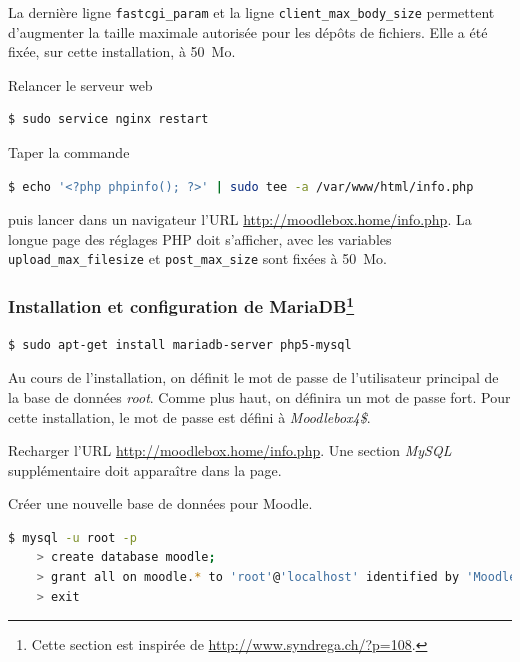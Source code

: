 \documentclass[11pt]{article}
\begin{document}


La dernière ligne \lstinline{fastcgi_param} et la ligne \lstinline{client_max_body_size} permettent d'augmenter la taille maximale autorisée pour les dépôts de fichiers. Elle a été fixée, sur cette installation, à 50~Mo.

Relancer le serveur web
\begin{lstlisting}[language=bash]
$ sudo service nginx restart
\end{lstlisting}

\begin{verification}
Taper la commande
\begin{lstlisting}[language=bash]
$ echo '<?php phpinfo(); ?>' | sudo tee -a /var/www/html/info.php
\end{lstlisting}
puis lancer dans un navigateur l'URL \url{http://moodlebox.home/info.php}. La longue page des réglages PHP doit s'afficher, avec les variables \lstinline{upload_max_filesize} et \lstinline{post_max_size} sont fixées à 50~Mo.
\end{verification}

\subsubsection[Installation et configuration de MariaDB]{Installation et configuration de MariaDB\footnote{Cette section est inspirée de \url{http://www.syndrega.ch/?p=108}.}}

\begin{lstlisting}[language=bash]
$ sudo apt-get install mariadb-server php5-mysql
\end{lstlisting}

Au cours de l'installation, on définit le mot de passe de l'utilisateur principal de la base de données \emph{root}. Comme plus haut,  on définira un mot de passe fort. Pour cette installation, le mot de passe est défini à \emph{Moodlebox4\$}.

\begin{verification}
Recharger l'URL \url{http://moodlebox.home/info.php}. Une section \emph{MySQL} supplémentaire doit apparaître dans la page.
\end{verification}

Créer une nouvelle base de données pour Moodle.

\begin{lstlisting}[language=bash]
$ mysql -u root -p
    > create database moodle;
    > grant all on moodle.* to 'root'@'localhost' identified by 'Moodlebox4$';
    > exit
\end{lstlisting}
\end{document}
